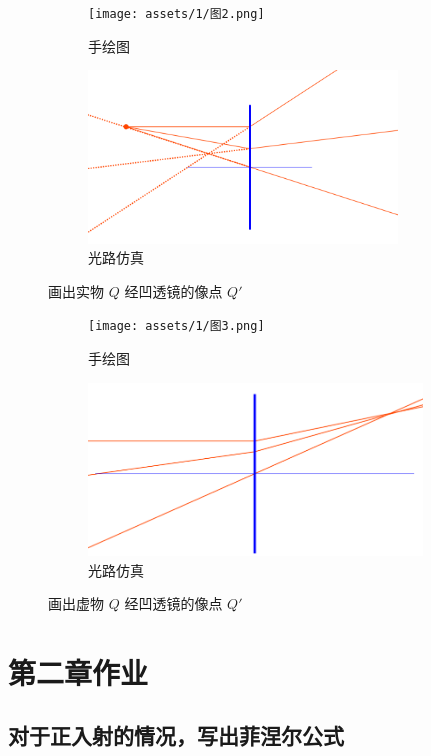 \documentclass[UTF8]{report}
\theoremstyle{MyLineTheoremStyle} %
\theoremstyle{MyBlockTheoremStyle} %
\theoremstyle{MySubsubsectionStyle} %
\begin{document}
\begin{figure}[H]\centering
    \begin{subfigure}[t]{0.47\textwidth}\centering
        \texttt{[image: assets/1/图2.png]}
        \caption{ 手绘图 }
    \end{subfigure}\begin{subfigure}[t]{0.52\textwidth}\centering
        \includegraphics[height=130pt]{assets/1/2.png}
        \caption{ 光路仿真 }
    \end{subfigure}
    \caption{ 画出实物 $Q$ 经凹透镜的像点 $Q'$}
\end{figure}

    \begin{figure}[H]\centering
\begin{subfigure}[t]{0.47\textwidth}\centering
    \texttt{[image: assets/1/图3.png]}
    \caption{ 手绘图 }
\end{subfigure}\begin{subfigure}[t]{0.52\textwidth}\centering
    \includegraphics[height=130pt]{assets/1/3.png}
    \caption{ 光路仿真 }
\end{subfigure}
\caption{ 画出虚物 $Q$ 经凹透镜的像点 $Q'$}
\end{figure}



\chapter{第二章作业}\thispagestyle{fancy}
\vspace{-2mm}
\section{对于正入射的情况，写出菲涅尔公式}
\end{document}
